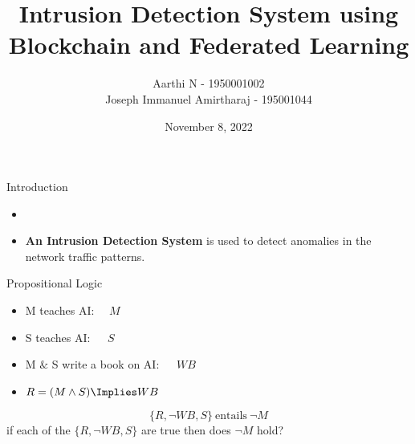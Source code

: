 \documentclass[xcolor=dvipsnames]{beamer}
\title[]{Intrusion Detection System using Blockchain and Federated Learning}
\author[Aarthi N, Joseph Amirtharaj]{Aarthi N - 1950001002 \\Joseph Immanuel Amirtharaj - 195001044}
\institute[SSNCE]{SSN College of Engineering, Chennai}
\date{November 8, 2022}
\begin{document}
\begin{frame}
\maketitle
\end{frame}








\begin{frame}{Introduction}
\begin{itemize}
\item 
\item {\bf An Intrusion Detection System} is used to detect anomalies in the network traffic patterns. 
\end{itemize}
\end{frame}
%
\begin{frame}{Propositional Logic}
\begin{itemize}
\item M teaches AI:$~~~~~~M$
\item S teaches AI:$~~~~~~~S$
\item M $\&$ S write a book on AI:$~~~~~~~WB$
%
\pause
\item $R=(M\land S)\Implies WB$
%
\pause

\end{itemize}
\[\{R,\lnot WB,S\}~\mbox{entails}~\lnot M\]
\pause
if each of the $\{R,\lnot WB,S\}$ are true then does $\lnot M$ hold?
\end{frame}
\end{document}
